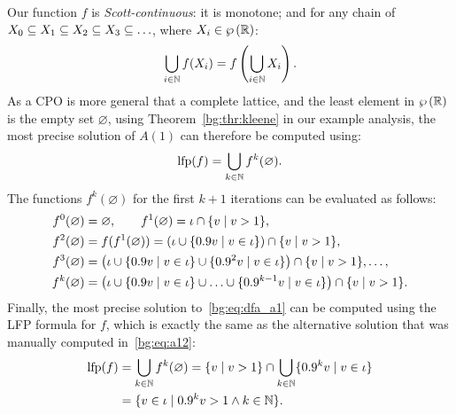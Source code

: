 Our function $f$ is \emph{Scott-continuous}: it is monotone; and for any chain
of $X_0 \subseteq X_1 \subseteq X_2 \subseteq X_3 \subseteq \mathellipsis$,
where $X_i \in \wp\left({\mathbb{R}}\right)$:
\begin{equation}
    \bigcup_{i \in \mathbb{N}} f(X_i) = f \left(
        \bigcup_{i \in \mathbb{N}} X_i
    \right).
\end{equation}
As a CPO is more general that a complete lattice, and the least
element in $\wp\left({\mathbb{R}}\right)$ is the empty set $\varnothing$, using
Theorem~\ref{bg:thr:kleene} in our example analysis, the most precise solution
of $A(1)$ can therefore be computed using:
\begin{equation}
    \operatorname{\mathrm{lfp}} (f) = \bigcup_{k \in \mathbb{N}} f^k (\varnothing).
\end{equation}
The functions $f^k(\varnothing)$ for the first $k+1$ iterations can be
evaluated as follows:
\begin{equation}
    \begin{aligned}
        f^0(\varnothing) &= \varnothing, \quad\quad
        f^1(\varnothing) = \iota \cap \{ v \mid v > 1 \}, \\
        f^2(\varnothing) &= f(f^1(\varnothing))
               = \left(
                     \iota \cup
                     \{ 0.9v \mid v \in \iota \}
                 \right) \cap \{ v \mid v > 1 \}, \\
        f^3(\varnothing) &= \left(
                     \iota \cup
                     \{ 0.9v \mid v \in \iota \} \cup
                     \{ 0.9^2 v \mid v \in \iota \}
                 \right) \cap \{ v \mid v > 1 \}, \mathellipsis, \\
        f^k(\varnothing) &= \left(
                     \iota \cup
                     \{ 0.9v \mid v \in \iota \} \cup
                     \mathellipsis \cup
                     \{ 0.9^{k-1} v \mid v \in \iota \}
                 \right) \cap \{ v \mid v > 1 \}.
    \end{aligned}
\end{equation}
Finally, the most precise solution to~\eqref{bg:eq:dfa_a1} can be computed
using the LFP formula for $f$, which is exactly the same as the alternative
solution that was manually computed in~\eqref{bg:eq:a12}:
\begin{equation}
    \begin{aligned}
        \operatorname{\mathrm{lfp}} (f)
            &= \bigcup_{k \in \mathbb{N}} f^k (\varnothing)
             = \{ v \mid v > 1 \} \cap
               \bigcup_{k \in \mathbb{N}} \{ 0.9^k v \mid v \in \iota \} \\
            &= \{ v \in \iota \mid 0.9^k v > 1 \wedge k \in \mathbb{N} \}.
    \end{aligned}
\end{equation}

